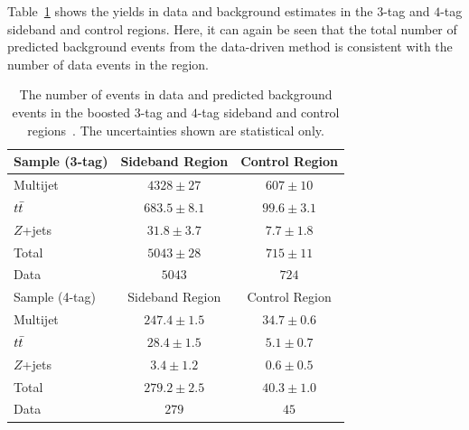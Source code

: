 Table~\ref{tab:4b_control} shows the yields in data and background estimates in the $3$-tag and $4$-tag sideband and control regions. Here, it can again be seen that the total number of predicted background events from the data-driven method is consistent with the number of data events in the region. 

\begin{table}[!ht]
\captionsetup{justification=centering}
\begin{center}
\begin{tabular}{ l c  c  }
\toprule
 Sample (3-tag) & Sideband Region       & Control Region  \\ 
\midrule
Multijet        & $4328   \pm 27$       & $607  \pm  10$  \\
$t\bar{t}$          & $683.5  \pm 8.1$      & $99.6 \pm  3.1$ \\
$Z$+jets        & $31.8   \pm 3.7$      & $7.7  \pm  1.8$ \\
\midrule
Total           & $5043 \pm 28$     & $715\pm  11$ \\
\midrule
Data            & $5043$                  & $724$     \\  
\toprule
  Sample (4-tag) & Sideband Region      & Control Region  \\ 
\midrule
Multijet         & $247.4 \pm 1.5$      & $34.7  \pm  0.6$ \\
$t\bar{t}$           & $28.4  \pm 1.5$      & $5.1   \pm  0.7$ \\
$Z$+jets         & $3.4   \pm 1.2$      & $0.6   \pm  0.5$  \\
\midrule
Total            & $279.2 \pm 2.5$     & $40.3  \pm  1.0$  \\
\midrule
Data             & $279$                  & $45$     \\ 
\bottomrule
\end{tabular}
\caption{The number of events in data and predicted background events in the boosted $3$-tag and $4$-tag sideband and control
  regions~\cite{4bconf}. The uncertainties shown are statistical only.}
\label{tab:4b_control} 
\end{center}
\end{table}

